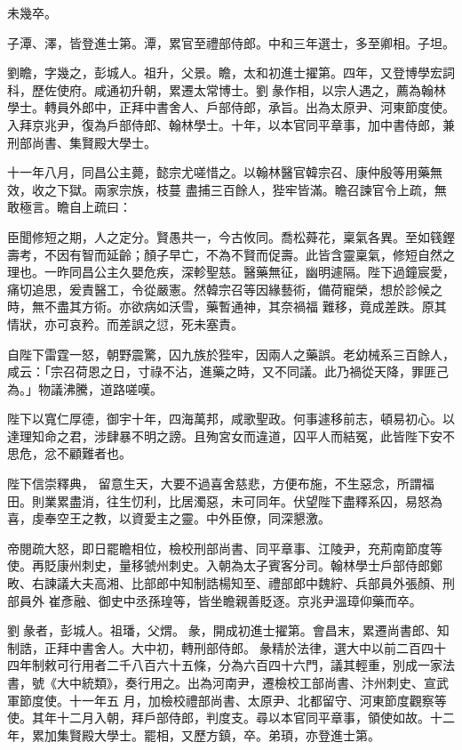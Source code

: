 \begin{pinyinscope}
 未幾卒。



 子潭、澤，皆登進士第。潭，累官至禮部侍郎。中和三年選士，多至卿相。子坦。



 劉瞻，字幾之，彭城人。祖升，父景。瞻，太和初進士擢第。四年，又登博學宏詞科，歷佐使府。咸通初升朝，累遷太常博士。劉彖作相，以宗人遇之，薦為翰林學士。轉員外郎中，正拜中書舍人、戶部侍郎，承旨。出為太原尹、河東節度使。入拜京兆尹，復為戶部侍郎、翰林學士。十年，以本官同平章事，加中書侍郎，兼刑部尚書、集賢殿大學士。



 十一年八月，同昌公主薨，懿宗尤嗟惜之。以翰林醫官韓宗召、康仲殷等用藥無效，收之下獄。兩家宗族，枝蔓
 盡捕三百餘人，狴牢皆滿。瞻召諫官令上疏，無敢極言。瞻自上疏曰：



 臣聞修短之期，人之定分。賢愚共一，今古攸同。喬松蕣花，稟氣各異。至如篯鏗壽考，不因有智而延齡；顏子早亡，不為不賢而促壽。此皆含靈稟氣，修短自然之理也。一昨同昌公主久嬰危疾，深軫聖慈。醫藥無征，幽明遽隔。陛下過鐘宸愛，痛切追思，爰責醫工，令從嚴憲。然韓宗召等因緣藝術，備荷寵榮，想於診候之時，無不盡其方術。亦欲病如沃雪，藥暫通神，其奈禍福
 難移，竟成差跌。原其情狀，亦可哀矜。而差誤之愆，死未塞責。



 自陛下雷霆一怒，朝野震驚，囚九族於狴牢，因兩人之藥誤。老幼械系三百餘人，咸云：「宗召荷恩之日，寸祿不沾，進藥之時，又不同議。此乃禍從天降，罪匪己為。」物議沸騰，道路嗟嘆。



 陛下以寬仁厚德，御宇十年，四海萬邦，咸歌聖政。何事遽移前志，頓易初心。以達理知命之君，涉肆暴不明之謗。且殉宮女而違道，囚平人而結冤，此皆陛下安不思危，忿不顧難者也。



 陛下信崇釋典，
 留意生天，大要不過喜舍慈悲，方便布施，不生惡念，所謂福田。則業累盡消，往生忉利，比居濁惡，未可同年。伏望陛下盡釋系囚，易怒為喜，虔奉空王之教，以資愛主之靈。中外臣僚，同深懇激。



 帝閱疏大怒，即日罷瞻相位，檢校刑部尚書、同平章事、江陵尹，充荊南節度等使。再貶康州刺史，量移虢州刺史。入朝為太子賓客分司。翰林學士戶部侍郎鄭畋、右諫議大夫高湘、比部郎中知制誥楊知至、禮部郎中魏紵、兵部員外張顏、刑部員外
 崔彥融、御史中丞孫瑝等，皆坐瞻親善貶逐。京兆尹溫璋仰藥而卒。



 劉彖者，彭城人。祖璠，父煟。彖，開成初進士擢第。會昌末，累遷尚書郎、知制誥，正拜中書舍人。大中初，轉刑部侍郎。彖精於法律，選大中以前二百四十四年制敕可行用者二千八百六十五條，分為六百四十六門，議其輕重，別成一家法書，號《大中統類》，奏行用之。出為河南尹，遷檢校工部尚書、汴州刺史、宣武軍節度使。十一年五
 月，加檢校禮部尚書、太原尹、北都留守、河東節度觀察等使。其年十二月入朝，拜戶部侍郎，判度支。尋以本官同平章事，領使如故。十二年，累加集賢殿大學士。罷相，又歷方鎮，卒。弟頊，亦登進士第。




\end{pinyinscope}
